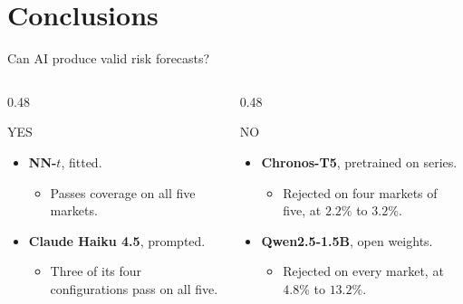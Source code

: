 \documentclass[9pt, aspectratio=169, t]{beamer}
\begin{document}
\section{Conclusions}
\begin{frame}{Can AI produce valid risk forecasts?}
  \begin{columns}[T]
    \begin{column}{0.48\textwidth}
      \begin{block}{YES}
        \begin{itemize}
          \item \textbf{NN-$t$}, fitted.
            \begin{itemize}
              \item Passes coverage on all five markets.
            \end{itemize}
          \item \textbf{Claude Haiku 4.5}, prompted.
            \begin{itemize}
              \item Three of its four configurations pass on all five.
            \end{itemize}
        \end{itemize}
      \end{block}
    \end{column}
    \begin{column}{0.48\textwidth}
      \begin{alertblock}{NO}
        \begin{itemize}
          \item \textbf{Chronos-T5}, pretrained on series.
            \begin{itemize}
              \item Rejected on four markets of five, at $2.2\%$ to $3.2\%$.
            \end{itemize}
          \item \textbf{Qwen2.5-1.5B}, open weights.
            \begin{itemize}
              \item Rejected on every market, at $4.8\%$ to $13.2\%$.
            \end{itemize}
        \end{itemize}
      \end{alertblock}
    \end{column}
  \end{columns}
  \vspace{0.4em}
  \begin{itemize}

\end{itemize}
\end{frame}
\end{document}
